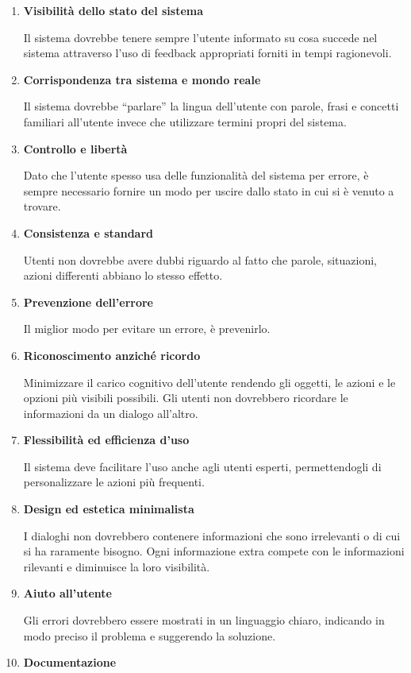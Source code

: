 \documentclass[12pt,italian,]{report}
\begin{document}
\begin{enumerate}
\def\labelenumi{\arabic{enumi}.}
\item
  \textbf{Visibilità dello stato del sistema}

  Il sistema dovrebbe tenere sempre l'utente informato su cosa succede
  nel sistema attraverso l'uso di feedback appropriati forniti in tempi
  ragionevoli.
\item
  \textbf{Corrispondenza tra sistema e mondo reale}

  Il sistema dovrebbe ``parlare'' la lingua dell'utente con parole,
  frasi e concetti familiari all'utente invece che utilizzare termini
  propri del sistema.
\item
  \textbf{Controllo e libertà}

  Dato che l'utente spesso usa delle funzionalità del sistema per
  errore, è sempre necessario fornire un modo per uscire dallo stato in
  cui si è venuto a trovare.
\item
  \textbf{Consistenza e standard}

  Utenti non dovrebbe avere dubbi riguardo al fatto che parole,
  situazioni, azioni differenti abbiano lo stesso effetto.
\item
  \textbf{Prevenzione dell'errore}

  Il miglior modo per evitare un errore, è prevenirlo.
\item
  \textbf{Riconoscimento anziché ricordo}

  Minimizzare il carico cognitivo dell'utente rendendo gli oggetti, le
  azioni e le opzioni più visibili possibili. Gli utenti non dovrebbero
  ricordare le informazioni da un dialogo all'altro.
\item
  \textbf{Flessibilità ed efficienza d'uso}

  Il sistema deve facilitare l'uso anche agli utenti esperti,
  permettendogli di personalizzare le azioni più frequenti.
\item
  \textbf{Design ed estetica minimalista}

  I dialoghi non dovrebbero contenere informazioni che sono irrelevanti
  o di cui si ha raramente bisogno. Ogni informazione extra compete con
  le informazioni rilevanti e diminuisce la loro visibilità.
\item
  \textbf{Aiuto all'utente}

  Gli errori dovrebbero essere mostrati in un linguaggio chiaro,
  indicando in modo preciso il problema e suggerendo la soluzione.
\item
  \textbf{Documentazione}



\end{enumerate}
\end{document}
